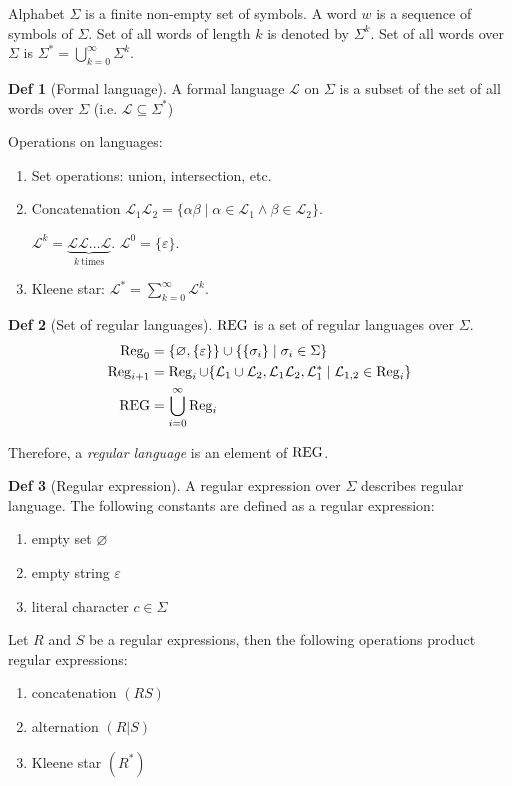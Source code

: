 \documentclass[a4paper]{article}
\theoremstyle{definition}
\newtheorem{definition}{Def}
\begin{document}
Alphabet \(\Sigma\) is a finite non-empty set of symbols.
A word \(w\) is a sequence of symbols of \(\Sigma\).
Set of all words of length \(k\) is denoted by \(\Sigma^k\).
Set of all words over \(\Sigma\) is
\(\Sigma^* = \bigcup_{k = 0}^{\infty} \Sigma^k\).

\newcommand{\LLang}{\mathcal{L}}

\begin{definition}[Formal language]
  A formal language \(\LLang\) on \(\Sigma\) is a subset
  of the set of all words over \(\Sigma\) (i.e. \(\LLang \subseteq \Sigma^*\))
\end{definition}
Operations on languages:
\begin{enumerate}
  \item Set operations: union, intersection, etc.
  \item Concatenation
    \(\LLang_1 \LLang_2 = \{ \alpha \beta \mid \alpha \in \LLang_1 \land \beta \in \LLang_2 \}\).

    \(\LLang^k = \underbrace{\LLang \LLang \ldots \LLang}_{k\ \text{times}}\).
    \(\LLang^0 = \{\varepsilon\}\).
  \item Kleene star: \(\LLang^* = \sum_{k = 0}^{\infty} \LLang^k\).
\end{enumerate}

\begin{definition}[Set of regular languages]
  \(\operatorname{REG}\) is a set of regular languages over \(\Sigma\).
  \begin{align*}
    \Reg_0 &= \{ \varnothing, \{\varepsilon\} \}
    \cup \{ \{ \sigma_i \} \mid \sigma_i \in \Sigma \} \\
    \Reg_{i + 1} &= \Reg_i \cup \{\LLang_1 \cup \LLang_2, \LLang_1 \LLang_2,
    \LLang_1^* \mid \LLang_{1, 2} \in \Reg_i\} \\
    \REG &= \bigcup_{i = 0}^{\infty} \Reg_i
  \end{align*}
\end{definition}

Therefore, a \textit{regular language} is an element of \(\operatorname{REG}\).

\begin{definition}[Regular expression]
  A regular expression over \(\Sigma\) describes regular language.
  The following constants are defined as a regular expression:
   \begin{enumerate}
    \item empty set \(\varnothing\)
    \item empty string \(\varepsilon\)
    \item literal character \(c \in \Sigma\)
  \end{enumerate}
  Let \(R\) and \(S\) be a regular expressions, then the following operations
  product regular expressions:
  \begin{enumerate}
    \item concatenation \((RS)\)
    \item alternation  \((R|S)\)
    \item Kleene star \((R^*)\)
  \end{enumerate}
\end{definition}
\end{document}
